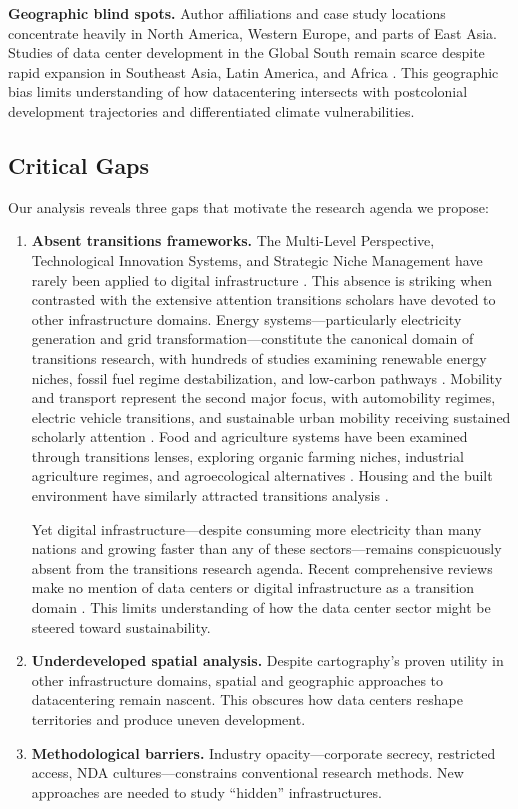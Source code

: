 \documentclass[review]{elsarticle}
\begin{document}
\textbf{Geographic blind spots.} Author affiliations and case study locations concentrate heavily in North America, Western Europe, and parts of East Asia. Studies of data center development in the Global South remain scarce despite rapid expansion in Southeast Asia, Latin America, and Africa \citep{SEADS2024}. This geographic bias limits understanding of how datacentering intersects with postcolonial development trajectories and differentiated climate vulnerabilities.

\subsection{Critical Gaps}

Our analysis reveals three gaps that motivate the research agenda we propose:

\begin{enumerate}
    \item \textbf{Absent transitions frameworks.} The Multi-Level Perspective, Technological Innovation Systems, and Strategic Niche Management have rarely been applied to digital infrastructure \citep{Geels2002, Markard2012}. This absence is striking when contrasted with the extensive attention transitions scholars have devoted to other infrastructure domains. Energy systems---particularly electricity generation and grid transformation---constitute the canonical domain of transitions research, with hundreds of studies examining renewable energy niches, fossil fuel regime destabilization, and low-carbon pathways \citep{Geels2014, Verbong2007}. Mobility and transport represent the second major focus, with automobility regimes, electric vehicle transitions, and sustainable urban mobility receiving sustained scholarly attention \citep{Geels2012, Nykvist2008}. Food and agriculture systems have been examined through transitions lenses, exploring organic farming niches, industrial agriculture regimes, and agroecological alternatives \citep{Elzen2017, Spaargaren2012}. Housing and the built environment have similarly attracted transitions analysis \citep{Rohracher2001}.

    Yet digital infrastructure---despite consuming more electricity than many nations and growing faster than any of these sectors---remains conspicuously absent from the transitions research agenda. Recent comprehensive reviews make no mention of data centers or digital infrastructure as a transition domain \citep{Kohler2019, Loorbach2017}. This limits understanding of how the data center sector might be steered toward sustainability.

    \item \textbf{Underdeveloped spatial analysis.} Despite cartography's proven utility in other infrastructure domains, spatial and geographic approaches to datacentering remain nascent. This obscures how data centers reshape territories and produce uneven development.

    \item \textbf{Methodological barriers.} Industry opacity---corporate secrecy, restricted access, NDA cultures---constrains conventional research methods. New approaches are needed to study ``hidden'' infrastructures.
\end{enumerate}
\end{document}

